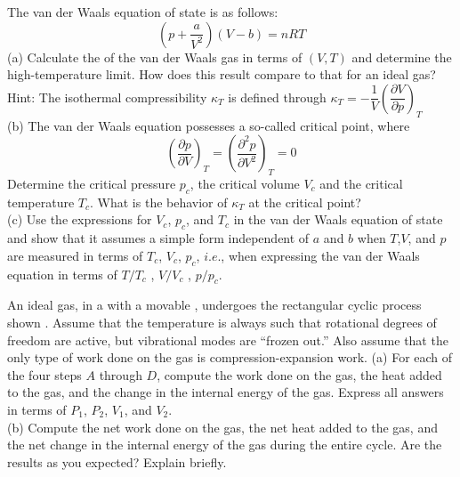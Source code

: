 \begin{example}
    The van der Waals equation of state is as follows:
    \begin{equation*}
        (p+\frac{a}{V^{2}})(V-b)=nRT
    \end{equation*}
    (a) Calculate the  of the van der Waals gas in terms of $(V,T)$ and
    determine the high-temperature limit. How does this result compare to that for an ideal gas?\\
    Hint: The isothermal compressibility $\kappa_T$ is defined through $\kappa_{T}=-\dfrac{1}{V}\left(\dfrac{\partial V}{\partial p}\right)_{T}$\\
    (b) The van der Waals equation possesses a so-called critical point, where
    \begin{equation*}
        \left(\frac{\partial p}{\partial V}\right)_{T} = \left(\frac{\partial^{2} p}{\partial V^{2}}\right)_{T} = 0
    \end{equation*}
    Determine the critical pressure $p_c$, the critical volume $V_c$ and the critical temperature $T_c$. What
    is the behavior of $\kappa_T$ at the critical point?\\
    (c) Use the expressions for $V_c$, $p_c$, and $T_c$ in the van der Waals equation of state and show that it
    assumes a simple form independent of $a$ and $b$ when $T$,$V$, and $p$ are measured in terms of $T_c$,
    $V_c$, $p_c$, $i.e.$, when expressing the van der Waals equation in terms of $T/T_c$ , $V/V_c$ , $p/p_c$.
\end{example}
\begin{example}
    An ideal  gas, in a  with a movable , undergoes the rectangular cyclic process shown
    . Assume that the temperature is always such
    that rotational degrees of freedom are active, but vibrational modes are “frozen out.” Also assume that the only
    type of work done on the gas is  compression-expansion work.
    (a) For each of the four steps $A$ through $D$, compute the work done on the gas, the heat added to
    the gas, and the change in the internal energy of the gas.
    Express all answers in terms of $P_1$, $P_2$, $V_1$, and $V_2$. \\
    (b) Compute the net work done on the gas, the net
    heat added to the gas, and the net change in the internal
    energy of the gas during the entire cycle. Are the results
    as you expected? Explain briefly.
\end{example}
